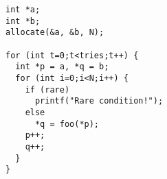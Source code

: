 \begin{lstlisting}[morekeywords={g_qCount},belowskip=0pt]
int *a;
int *b;
allocate(&a, &b, N);

for (int t=0;t<tries;t++) {
  int *p = a, *q = b;
  for (int i=0;i<N;i++) {
    if (rare)
      printf("Rare condition!");
    else
      *q = foo(*p);
    p++;
    q++;
  }
}
\end{lstlisting}
